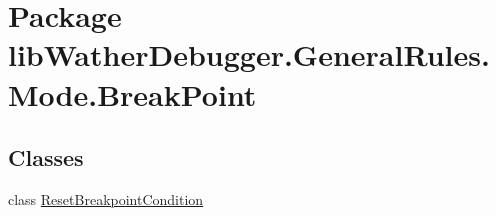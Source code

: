 \hypertarget{namespacelib_wather_debugger_1_1_general_rules_1_1_mode_1_1_break_point}{\section{Package lib\+Wather\+Debugger.\+General\+Rules.\+Mode.\+Break\+Point}
\label{namespacelib_wather_debugger_1_1_general_rules_1_1_mode_1_1_break_point}
}
\subsection*{Classes}
\begin{DoxyCompactItemize}
\item 
class \hyperlink{classlib_wather_debugger_1_1_general_rules_1_1_mode_1_1_break_point_1_1_reset_breakpoint_condition}{Reset\+Breakpoint\+Condition}
\end{DoxyCompactItemize}
